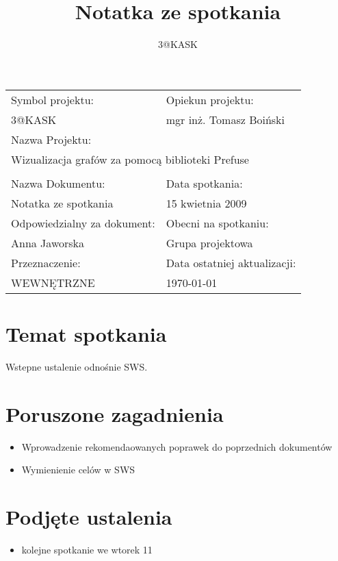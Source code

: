 \documentclass[a4paper,10pt]{article}
\title{Notatka ze spotkania}
\author{3@KASK}
\begin{document}



\maketitle


\begin{center}
\begin{tabular}{|p{7cm}|p{7cm}|}
\hline
Symbol projektu: & Opiekun projektu:   \tabularnewline 
3@KASK & mgr inż. Tomasz Boiński    \tabularnewline \hline
\multicolumn{2}{|l|}{Nazwa Projektu: } \tabularnewline
\multicolumn{2}{|l|}{Wizualizacja grafów za pomocą biblioteki Prefuse } \tabularnewline 
\hline
\multicolumn{2}{l}{ } \tabularnewline %
\hline 
Nazwa Dokumentu: & Data spotkania:   \tabularnewline 
Notatka ze spotkania & 15 kwietnia 2009 \tabularnewline \hline
Odpowiedzialny za dokument: & Obecni na spotkaniu:   \tabularnewline 
Anna Jaworska & Grupa projektowa \tabularnewline \hline
Przeznaczenie: & Data ostatniej aktualizacji:   \tabularnewline 
WEWNĘTRZNE & \today \tabularnewline \hline
\end{tabular}
\end{center}



\section{Temat spotkania}

Wstepne ustalenie odnośnie SWS.

\section{Poruszone zagadnienia}
\begin{itemize}
 	\item Wprowadzenie rekomendaowanych poprawek do poprzednich dokumentów
	\item Wymienienie celów w SWS
\end{itemize}


\section{Podjęte ustalenia}
\begin{itemize}
 \item kolejne spotkanie we wtorek 11

\end{itemize}
\end{document}
